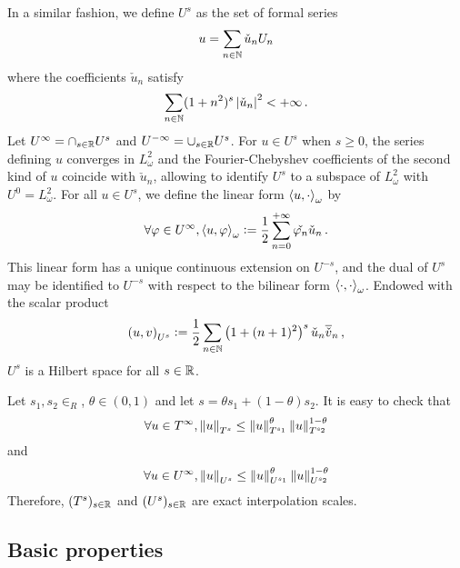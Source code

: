 \documentclass[a4paper]{article}
\begin{document}
\begin{Def}
	In a similar fashion, we define $U^{s}$ as the set of formal series 
	\[u = \sum_{n \in \mathbb{N}}\check{u}_n U_n\]
	where the coefficients $\check{u}_n$ satisfy
	\[\sum_{n \in \mathbb{N}} (1 + n^2)^s \left\lvert \check{u}_n \right\rvert^2 < + \infty\,.\]
	Let $U^\infty = \cap_{s \in \mathbb{R}} U^s$ and $U^{-\infty} = \cup_{s \in \mathbb{R}} U^s$. For $u \in U^s$ when $s \geq 0$, the series defining $u$ converges in $L^2_{\omega}$ and the Fourier-Chebyshev coefficients of the second kind of $u$ coincide with $\check{u}_n$, allowing to identify $U^s$ to a subspace of $L^2_{\omega}$ with $U^0 = L^2_\omega$. For all $u \in U^s$, we define the linear form $\left\langle u,\cdot\right\rangle_\omega$ by 
	\begin{equation}
		\label{dualiteUs}
		\forall \varphi \in U^\infty, \left\langle u,\varphi\right\rangle_\omega \mathrel{\mathop:}= \frac{1}{2} \sum_{n = 0}^{+ \infty} \check{\varphi_n}\check{u}_n\,.
	\end{equation}
	This linear form has a unique continuous extension on $U^{-s}$, and the dual of $U^s$ may be identified to $U^{-s}$ with respect to the bilinear form $\left\langle \cdot,\cdot\right\rangle_{\omega}$.
	Endowed with the scalar product
	\[\left( u,v\right)_{U^s} \mathrel{\mathop:}= \frac{1}{2}\sum_{n \in \mathbb{N}} \left(1 + (n + 1)^2\right)^s \check{u}_n \overline{\check{v}}_n\,,\] 
	$U^s$ is a Hilbert space for all $s \in \mathbb{R}$. 
\end{Def}

Let $s_1,s_2 \in _R$, $\theta \in (0,1)$ and let $s = \theta s_1 + (1-\theta)s_2$. It is easy to check that
\[\forall u \in T^\infty, \left\|u\right\|_{T^s} \leq \left\|u\right\|_{T^{s_1}}^\theta \left\|u\right\|_{T^{s_2}}^{1 - \theta}\]
and 
\[\forall u \in U^\infty, \left\|u\right\|_{U^s} \leq \left\|u\right\|_{U^{s_1}}^\theta \left\|u\right\|_{U^{s_2}}^{1 - \theta}\]
Therefore, $(T^s)_{s \in \mathbb{R}}$ and $(U^s)_{s \in \mathbb{R}}$ are exact interpolation scales. 

\subsection{Basic properties}
\end{document}
